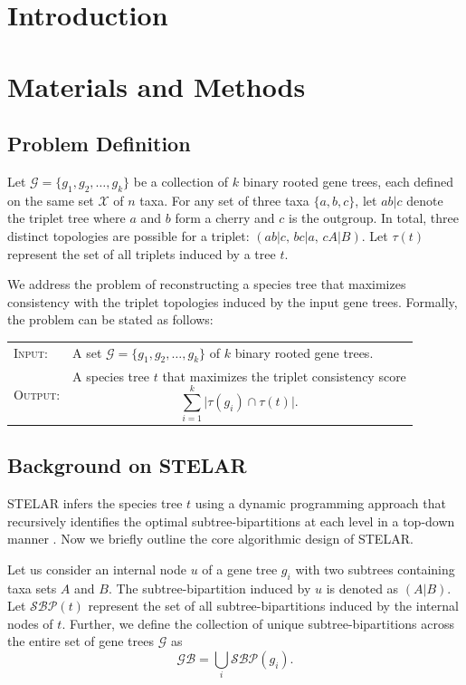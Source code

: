 \documentclass[runningheads]{llncs}
\begin{document}


\section{Introduction}

\section{Materials and Methods}

\subsection{Problem Definition}

Let $\mathcal{G} = \{g_1, g_2, \ldots, g_k\}$ be a collection of $k$ binary rooted gene trees, each defined on the same set $\mathcal{X}$ of $n$ taxa. For any set of three taxa $\{a,b,c\}$, let $ab|c$ denote the triplet tree where $a$ and $b$ form a cherry and $c$ is the outgroup. In total, three distinct topologies are possible for a triplet: $(ab|c,\, bc|a,\, cA|B)$. Let $\tau(t)$ represent the set of all triplets induced by a tree $t$.  

We address the problem of reconstructing a species tree that maximizes consistency with the triplet topologies induced by the input gene trees. Formally, the problem can be stated as follows:  

\vspace{0.3cm}
\begin{tabular}{p{2cm}p{10.5cm}}
\textsc{Input:} & A set $\mathcal{G} = \{g_1, g_2, \ldots, g_k\}$ of $k$ binary rooted gene trees. \\
\textsc{Output:} & A species tree $t$ that maximizes the triplet consistency score  
\[
\sum_{i=1}^{k} \big|\tau(g_i) \cap \tau(t)\big|.
\]
\end{tabular}




\subsection{Background on STELAR}

STELAR infers the species tree $t$ using a dynamic programming approach that recursively identifies the optimal subtree-bipartitions at each level in a top-down manner \cite{Islam-STELAR-2020}. Now we briefly outline the core algorithmic design of STELAR.  

Let us consider an internal node $u$ of a gene tree $g_i$ with two subtrees containing taxa sets $A$ and $B$. The subtree-bipartition induced by $u$ is denoted as $(A|B)$. Let $\mathcal{SBP}(t)$ represent the set of all subtree-bipartitions induced by the internal nodes of $t$. Further, we define the collection of unique subtree-bipartitions across the entire set of gene trees $\mathcal{G}$ as  
\[
\mathcal{GB} = \bigcup_{i} \mathcal{SBP}(g_i).
\]  
\end{document}
